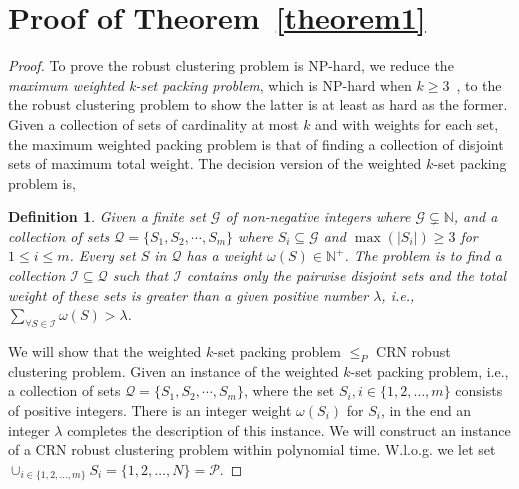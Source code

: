 \documentclass[times]{ettauth}
\newcommand{\ie}{i.e., }
\theoremstyle{mytheoremstyle}
\theoremstyle{mytheoremstyle}
\theoremstyle{mytheoremstyle}
\newtheorem{mydef}{Definition}
\begin{document}
%
\section{Proof of Theorem~\ref{theorem1}}
\label{proof_theorem1}
\begin{proof}
To prove the robust clustering problem is NP-hard, we reduce the \textit{maximum weighted k-set packing problem}, which is NP-hard when $k\geqslant 3$~\cite{Computers_a_Intractability}, to the the robust clustering problem to show the latter is at least as hard as the former.
Given a collection of sets of cardinality at most $k$ and with weights for each set, the maximum weighted packing problem is that of finding a collection of disjoint sets of maximum total weight.
The decision version of the weighted $k$-set packing problem is,
\begin{mydef}
\label{def_kset_packing}
Given a finite set $\mathcal{G}$ of non-negative integers where $\mathcal{G} \subsetneq \mathbb{N}$, and a collection of sets $\mathcal{Q}=\{S_1,S_2,\cdots,S_m\}$ where $S_i \subseteq \mathcal{G}$ and $\max(|S_i|)\geq 3$ for $1 \leq i \leq m$.
Every set $S$ in $\mathcal{Q}$ has a weight $\omega(S) \in \mathbb{N}^+$. 
%
The problem is to find a collection $\mathcal{I} \subseteq \mathcal{Q}$ such that $\mathcal{I}$ contains only the pairwise disjoint sets and the total weight of these sets is greater than a given positive number $\lambda$, i.e., $\sum_{\forall S \in \mathcal{I}} \omega(S) > \lambda$.
\end{mydef}



We will show that the weighted $k$-set packing problem $\leq_P$ CRN robust clustering problem.
Given an instance of the weighted $k$-set packing problem, \ie a collection of sets $\mathcal{Q}=\{S_1,S_2,\cdots,S_m\}$, where the set $S_i, i\in \{1,2,\ldots,m\}$ consists of positive integers.
There is an integer weight $\omega(S_i)$ for $S_i$, in the end an integer $\lambda$ completes the description of this instance.
We will construct an instance of a CRN robust clustering problem within polynomial time.
W.l.o.g. we let set $\cup_{i\in\{1, 2,\ldots, m\}}S_i = \{ 1, 2,\ldots , N \} = \mathcal{P}$.


\end{proof}
\end{document}
